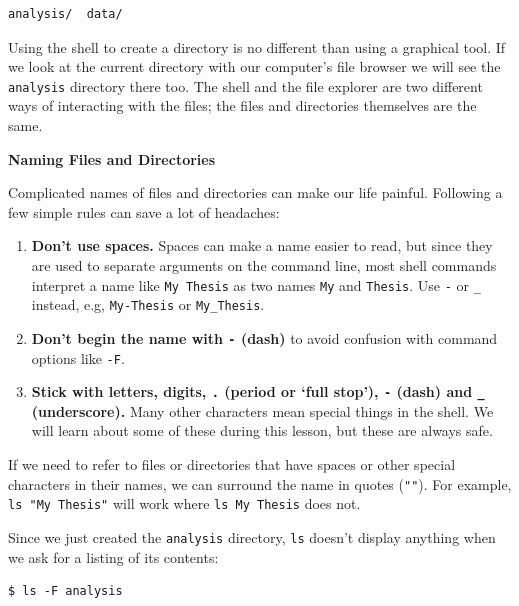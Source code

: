 \documentclass[
]{krantz}
\renewenvironment{quote}{\begin{VF}}{\end{VF}}
\begin{document}
\begin{verbatim}
analysis/  data/
\end{verbatim}

Using the shell to create a directory is no different than using a graphical tool.
If we look at the current directory with our computer's file browser
we will see the \texttt{analysis} directory there too.
The shell and the file explorer are two different ways of interacting with the files;
the files and directories themselves are the same.

\begin{quote}
\textbf{Naming Files and Directories}

Complicated names of files and directories can make our life painful.
Following a few simple rules can save a lot of headaches:

\begin{enumerate}
\def\labelenumi{\arabic{enumi}.}
\item
  \textbf{Don't use spaces.}
  Spaces can make a name easier to read,
  but since they are used to separate arguments on the command line,
  most shell commands interpret a name like \texttt{My\ Thesis} as two names \texttt{My} and \texttt{Thesis}.
  Use \texttt{-} or \texttt{\_} instead,
  e.g, \texttt{My-Thesis} or \texttt{My\_Thesis}.
\item
  \textbf{Don't begin the name with \texttt{-} (dash)}
  to avoid confusion with command options like \texttt{-F}.
\item
  \textbf{Stick with letters, digits, \texttt{.} (period or `full stop'), \texttt{-} (dash) and \texttt{\_} (underscore).}
  Many other characters mean special things in the shell.
  We will learn about some of these during this lesson,
  but these are always safe.
\end{enumerate}

If we need to refer to files or directories that have spaces or other special characters in their names,
we can surround the name in quotes (\texttt{""}).
For example, \texttt{ls\ "My\ Thesis"} will work where \texttt{ls\ My\ Thesis} does not.
\end{quote}

Since we just created the \texttt{analysis} directory,
\texttt{ls} doesn't display anything when we ask for a listing of its contents:

\begin{verbatim}
$ ls -F analysis
\end{verbatim}
\end{document}
